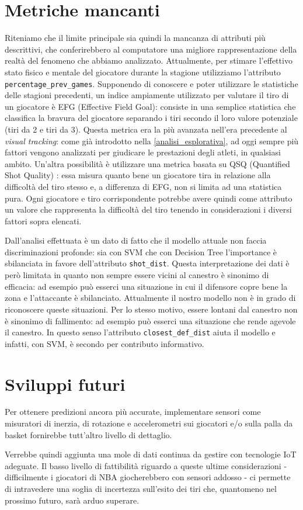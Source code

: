 \section{Metriche mancanti}
\label{metrichemancanti}
Riteniamo che il limite principale sia quindi la mancanza di attributi più descrittivi, che conferirebbero al computatore una migliore rappresentazione della realtà del fenomeno che abbiamo analizzato.
Attualmente, per stimare l'effettivo stato fisico e mentale del giocatore durante la stagione utilizziamo l'attributo \texttt{percentage\_prev\_games}. Supponendo di conoscere e poter utilizzare le statistiche delle stagioni precedenti, un indice ampiamente utilizzato per valutare il tiro di un giocatore è EFG (Effective Field Goal): consiste in una semplice statistica che classifica la bravura del giocatore separando i tiri secondo il loro valore potenziale (tiri da 2 e tiri da 3).
Questa metrica era la più avanzata nell'era precedente al \textit{visual tracking}: come già introdotto nella \autoref{analisi_esplorativa}, ad oggi sempre più fattori vengono analizzati per giudicare le prestazioni degli atleti, in qualsiasi ambito.
Un'altra possibilità è utilizzare una metrica basata su QSQ (Quantified Shot Quality) \cite{chang2014quantifying}: essa misura quanto bene un giocatore tira in relazione alla difficoltà del tiro stesso e, a differenza di EFG, non si limita ad una statistica pura.
Ogni giocatore e tiro corrispondente potrebbe avere quindi come attributo un valore che rappresenta la difficoltà del tiro tenendo in considerazioni i diversi fattori sopra elencati.

Dall'analisi effettuata è un dato di fatto che il modello attuale non faccia discriminazioni profonde: sia con SVM che con Decision Tree l'importance è sbilanciata in favore dell'attributo \texttt{shot\_dist}. 
Questa interpretazione dei dati è però limitata in quanto non sempre essere vicini al canestro è sinonimo di efficacia: ad esempio può esserci una situazione in cui il difensore copre bene la zona e l'attaccante è sbilanciato. Attualmente il nostro modello non è in grado di riconoscere queste situazioni. Per lo stesso motivo, essere lontani dal canestro non è sinonimo di fallimento: ad esempio può esserci una situazione che rende agevole il canestro.
In questo senso l'attributo \texttt{closest\_def\_dist} aiuta il modello e infatti, con SVM, è secondo per contributo informativo.

\section{Sviluppi futuri}
Per ottenere predizioni ancora più accurate, implementare sensori come misuratori di inerzia, di rotazione e accelerometri sui giocatori e/o sulla palla da basket fornirebbe tutt'altro livello di dettaglio.

Verrebbe quindi aggiunta una mole di dati continua da gestire con tecnologie IoT adeguate. Il basso livello di fattibilità riguardo a queste ultime considerazioni - difficilmente i giocatori di NBA giocherebbero con sensori addosso - ci permette di intravedere una soglia di incertezza sull'esito dei tiri che, quantomeno nel prossimo futuro, sarà arduo superare.